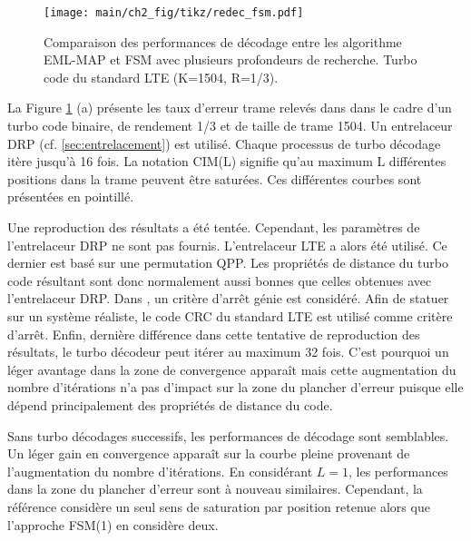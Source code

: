 \begin{figure}[!h]
	\centering
	\texttt{[image: main/ch2\_fig/tikz/redec\_fsm.pdf]}
	\vspace*{.3cm}
	\caption{\label{fig:fsm}Comparaison des performances de décodage entre les algorithme EML-MAP et FSM avec plusieurs 
	profondeurs de recherche. Turbo code du standard LTE (K=1504, R=1/3).}
\end{figure}

La Figure \ref{fig:fsm} (a) présente les taux d'erreur trame relevés dans \cite{cim} dans le cadre d'un turbo code binaire,
de rendement 1/3 et de taille de trame 1504. Un entrelaceur DRP (cf. \ref{sec:entrelacement})  est utilisé. Chaque processus de turbo décodage itère 
jusqu'à 16 fois. La notation CIM(L) signifie qu'au maximum L différentes positions dans la trame peuvent être saturées. 
Ces différentes courbes sont présentées en pointillé.

Une reproduction des résultats a été tentée. Cependant, les paramètres de l'entrelaceur DRP ne sont pas fournis. 
L'entrelaceur LTE a alors été utilisé. Ce dernier est basé sur une permutation QPP. Les propriétés de distance du turbo 
code résultant sont donc normalement aussi bonnes que celles obtenues avec l'entrelaceur DRP. Dans \cite{cim}, un critère 
d'arrêt génie est considéré. Afin de statuer sur un système réaliste, le code CRC du standard LTE est utilisé comme 
critère d'arrêt. Enfin, dernière différence dans cette tentative de reproduction des résultats, le turbo décodeur peut 
itérer au maximum 32 fois. C'est pourquoi un léger avantage dans la zone de convergence apparaît mais cette augmentation du nombre 
d'itérations n'a pas d'impact sur la zone du plancher d'erreur puisque elle dépend principalement des propriétés 
de distance du code.

Sans turbo décodages successifs, les performances de décodage sont semblables. Un léger gain en convergence apparaît 
sur  la courbe pleine provenant de l'augmentation du nombre d'itérations. En considérant $L=1$, les performances dans la
zone du plancher d'erreur sont à nouveau similaires. Cependant, la référence considère un seul sens de saturation par position
retenue alors que l'approche FSM(1) en considère deux. 

